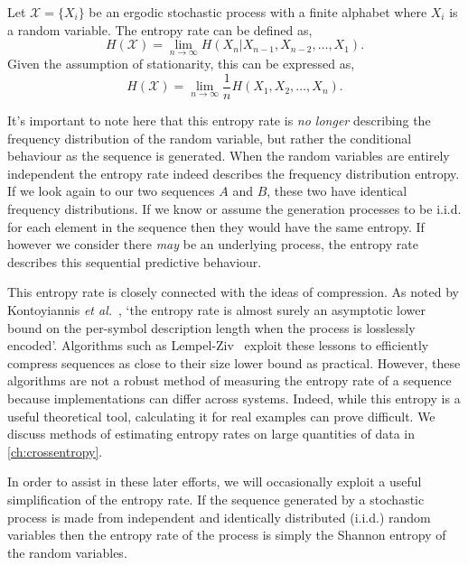 \begin{definition}\label{def:entropyrate}
	Let  $\mathcal{X}= \{ X_i \}$ be an ergodic stochastic process with a finite alphabet where $X_i$ is a random variable. 
	The entropy rate can be defined as,
	\begin{equation}\label{eq:entropyrate}
	H(\mathcal{X})=\lim _{n \rightarrow \infty} H\left(X_{n} | X_{n-1}, X_{n-2}, \ldots, X_{1}\right).
	\end{equation}
	Given the assumption of stationarity, this can be expressed as,
	\begin{equation}
	H(\mathcal{X})=\lim _{n \rightarrow \infty} \frac{1}{n} H\left(X_{1}, X_{2}, \ldots, X_{n}\right).
	\end{equation}
\end{definition}

It's important to note here that this entropy rate is \emph{no longer} describing the frequency distribution of the random variable, but rather the conditional behaviour as the sequence is generated. When the random variables are entirely independent the entropy rate indeed describes the frequency distribution entropy. If we look again to our two sequences $A$ and $B$, these two have identical frequency distributions. If we know or assume the generation processes to be i.i.d. for each element in the sequence then they would have the same entropy. If however we consider there \emph{may} be an underlying process, the entropy rate describes this sequential predictive behaviour.

This entropy rate is closely connected with the ideas of compression. As noted by Kontoyiannis \emph{et al.}~\cite{kontoyiannis_nonparametric_1998}, `the entropy rate is almost surely an asymptotic lower bound on the per-symbol description length when the process is losslessly encoded'. Algorithms such as Lempel-Ziv~\cite{ziv_compression_1978} exploit these lessons to efficiently compress sequences as close to their size lower bound as practical. However, these algorithms are not a robust method of measuring the entropy rate of a sequence because implementations can differ across systems. Indeed, while this entropy is a useful theoretical tool, calculating it for real examples can prove difficult. We discuss methods of estimating entropy rates on large quantities of data in \autoref{ch:crossentropy}.

In order to assist in these later efforts, we will occasionally exploit a useful simplification of the entropy rate. If the sequence generated by a stochastic process is made from independent and identically distributed  (i.i.d.) random variables then the entropy rate of the process is simply the Shannon entropy of the random variables. 

